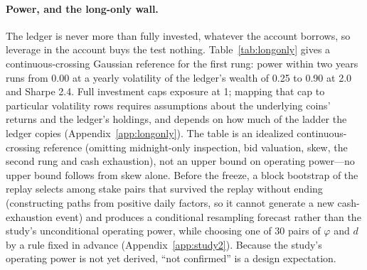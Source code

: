 \documentclass[11pt]{article}
\begin{document}
\paragraph{Power, and the long-only wall.} The ledger is never more than fully invested, whatever the account borrows, so leverage in the account buys the test nothing. Table~\ref{tab:longonly} gives a continuous-crossing Gaussian reference for the first rung: power within two years runs from 0.00 at a yearly volatility of the ledger's wealth of 0.25 to 0.90 at 2.0 and Sharpe 2.4. Full investment caps exposure at 1; mapping that cap to particular volatility rows requires assumptions about the underlying coins' returns and the ledger's holdings, and depends on how much of the ladder the ledger copies (Appendix~\ref{app:longonly}). The table is an idealized continuous-crossing reference (omitting midnight-only inspection, bid valuation, skew, the second rung and cash exhaustion), not an upper bound on operating power---no upper bound follows from skew alone. Before the freeze, a block bootstrap of the replay selects among stake pairs that survived the replay without ending (constructing paths from positive daily factors, so it cannot generate a new cash-exhaustion event) and produces a conditional resampling forecast rather than the study's unconditional operating power, while choosing one of 30 pairs of $\varphi$ and $d$ by a rule fixed in advance (Appendix~\ref{app:study2}). Because the study's operating power is not yet derived, ``not confirmed'' is a design expectation.
\end{document}
